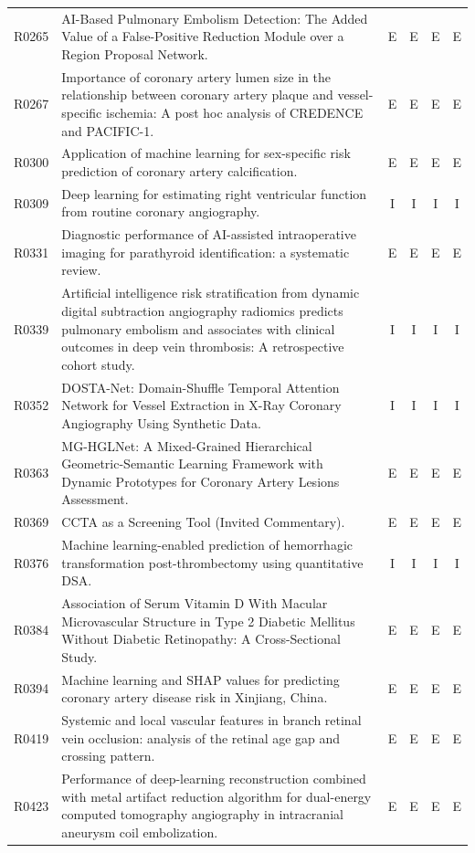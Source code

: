 \begin{longtable}{@{}l p{8.6cm} c c c c@{}}
R0265 & AI-Based Pulmonary Embolism Detection: The Added Value of a False-Positive Reduction Module over a Region Proposal Network. & E & E & E & E \\
R0267 & Importance of coronary artery lumen size in the relationship between coronary artery plaque and vessel-specific ischemia: A post hoc analysis of CREDENCE and PACIFIC-1. & E & E & E & E \\
R0300 & Application of machine learning for sex-specific risk prediction of coronary artery calcification. & E & E & E & E \\
R0309 & Deep learning for estimating right ventricular function from routine coronary angiography. & I & I & I & I \\
R0331 & Diagnostic performance of AI-assisted intraoperative imaging for parathyroid identification: a systematic review. & E & E & E & E \\
R0339 & Artificial intelligence risk stratification from dynamic digital subtraction angiography radiomics predicts pulmonary embolism and associates with clinical outcomes in deep vein thrombosis: A retrospective cohort study. & I & I & I & I \\
R0352 & DOSTA-Net: Domain-Shuffle Temporal Attention Network for Vessel Extraction in X-Ray Coronary Angiography Using Synthetic Data. & I & I & I & I \\
R0363 & MG-HGLNet: A Mixed-Grained Hierarchical Geometric-Semantic Learning Framework with Dynamic Prototypes for Coronary Artery Lesions Assessment. & E & E & E & E \\
R0369 & CCTA as a Screening Tool (Invited Commentary). & E & E & E & E \\
R0376 & Machine learning-enabled prediction of hemorrhagic transformation post-thrombectomy using quantitative DSA. & I & I & I & I \\
R0384 & Association of Serum Vitamin D With Macular Microvascular Structure in Type 2 Diabetic Mellitus Without Diabetic Retinopathy: A Cross-Sectional Study. & E & E & E & E \\
R0394 & Machine learning and SHAP values for predicting coronary artery disease risk in Xinjiang, China. & E & E & E & E \\
R0419 & Systemic and local vascular features in branch retinal vein occlusion: analysis of the retinal age gap and crossing pattern. & E & E & E & E \\
R0423 & Performance of deep-learning reconstruction combined with metal artifact reduction algorithm for dual-energy computed tomography angiography in intracranial aneurysm coil embolization. & E & E & E & E \\

\end{longtable}
